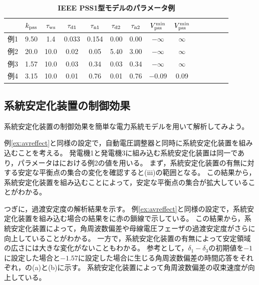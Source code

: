 \documentclass[tombow,dvipdfmx]{corona-a5-1.1}
\begin{document}
\begin{table}[h]
\medskip
 \caption{\textbf{IEEE PSS1型モデルのパラメータ例}}
 \label{table:psspara}
 \centering
  \begin{tabular}{lccccccccccccc}
   \hline
 &  $k_{\rm pss}$ & $\tau_{\rm ws}$ & $\tau_{{\rm d}1}$ & $\tau_{{\rm n}1}$ & $\tau_{{\rm d}2}$ & $\tau_{{\rm n}2}$ & $V_{\rm pss}^{\rm min}$ & $V_{\rm pss}^{\rm min}$ \\
   \hline \hline
   例1 \cite[12.5節]{kundur1994power}& 9.50 & 1.4 & 0.033 & 0.154 & 0.00 & 0.00 & $-\infty$ & $\infty$ \\
   例2 \cite[12.8節]{kundur1994power}& 20.0 & 10.0 & 0.02 & 0.05 & 5.40 & 3.00 & $-\infty$ & $\infty$ \\
   例3 \cite[III節]{chow2004power}& 1.57 & 10.0 & 0.03 & 0.34 & 0.03 & 0.34 & $-\infty$ & $\infty$ \\
   例4 \cite[Table H.3]{ieee2016ieee}& 3.15 & 10.0 & 0.01 & 0.76 & 0.01 & 0.76 & $-0.09$ & 0.09\\
   \hline
  \end{tabular}
\end{table}




\subsection{系統安定化装置の制御効果}\label{sec:pssov}

系統安定化装置の制御効果を簡単な電力系統モデルを用いて解析してみよう。

\begin{例}[系統安定化装置による定態安定性と過渡安定度の変化]\label{ex:psseffect}
例\ref{ex:avreffect}と同様の設定で，自動電圧調整器と同時に系統安定化装置を組み込むことを考える。
発電機1と発電機3に組み込む系統安定化装置は同一であり，パラメータはにおける例2の値を用いる。
まず，系統安定化装置の有無に対する安定な平衡点の集合の変化を確認すると(iii)の範囲となる。
この結果から，系統安定化装置を組み込むことによって，安定な平衡点の集合が拡大していることがわかる。

つぎに，過渡安定度の解析結果を示す。
例\ref{ex:avreffect}と同様の設定で，系統安定化装置を組み込む場合の結果をに赤の鎖線で示している。
この結果から，系統安定化装置によって，角周波数偏差や母線電圧フェーザの過渡安定度がさらに向上していることがわかる。
一方で，系統安定化装置の有無によって安定領域の広さには大きな変化がないこともわかる。
参考として，$\delta_1-\delta_3$の初期値を$-1$に設定した場合と$-1.57$に設定した場合に生じる角周波数偏差の時間応答をそれぞれ，の(a)と(b)に示す。
系統安定化装置によって角周波数偏差の収束速度が向上している。

\end{例}
\end{document}
